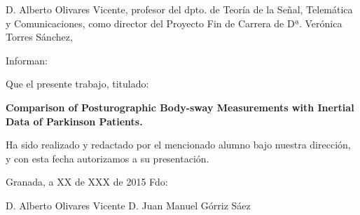 
\begin{titlepage}
\label{ch:Statement}
\vspace{2cm}

\noindent  D. Alberto Olivares Vicente, profesor  del dpto. de Teoría de la Señal, Telemática y Comunicaciones, como director del Proyecto Fin de Carrera de Dª. Verónica Torres Sánchez,

\vspace{2cm}
\noindent Informan:

\vspace{1.5cm}
\noindent Que el presente trabajo, titulado:

\noindent \textbf{Comparison of Posturographic Body-sway Measurements with Inertial Data of Parkinson Patients.}

\noindent Ha sido realizado y redactado por el mencionado alumno bajo nuestra dirección, y con esta fecha autorizamos a su presentación.
\vspace{3.5cm}

\noindent Granada, a XX de XXX de 2015 Fdo:

\vspace{6.5cm}
\noindent D. Alberto Olivares Vicente    \hfill   D. Juan Manuel Górriz Sáez

\end{titlepage} 